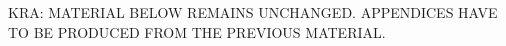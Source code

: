 \documentclass[runningheads]{llncs}       %
\begin{document}
\III

\NI
KRA: MATERIAL BELOW REMAINS UNCHANGED.
APPENDICES HAVE TO BE PRODUCED FROM THE PREVIOUS MATERIAL.








\end{document}
